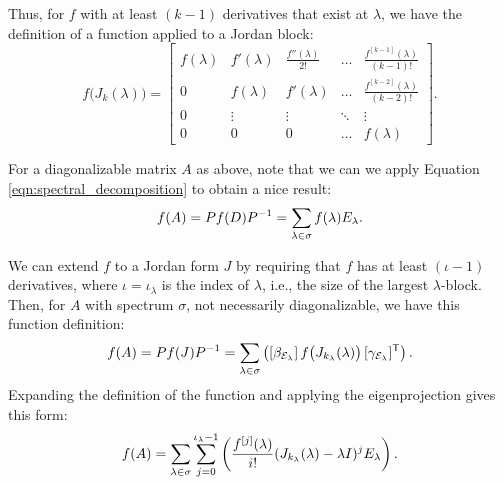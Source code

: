 \documentclass[../exploring-pagerank.tex]{subfiles}
\begin{document}
    Thus, for $f$ with at least $(k - 1)$ derivatives that exist at $\lambda$, we have the definition of a function applied to a Jordan block:
	\begin{equation}\label{eq:f_jordan_block}
		f\big( J_k(\lambda) \big) =
		\begin{bmatrix}
			f(\lambda) & f'(\lambda) & \frac{f''(\lambda)}{2!} & \ldots & \frac{f^{[k - 1]}(\lambda)}{(k-1)!} \\
			0 & f(\lambda) & f'(\lambda) & \ldots & \frac{f^{[k - 2]}(\lambda)}{(k-2)!} \\
			0 & \vdots & \vdots & \ddots & \vdots \\
			0 & 0 & 0 & \ldots & f(\lambda)
		\end{bmatrix}.
	\end{equation}

	For a diagonalizable matrix $A$ as above, note that we can we apply Equation \eqref{eqn:spectral_decomposition} to obtain a nice result:
	\begin{align*}
	    f(A) = Pf(D)P^{-1} = \sum_{\lambda \in \sigma}{f(\lambda) E_\lambda}.
	\end{align*}

	We can extend $f$ to a Jordan form $J$ by requiring that $f$ has at least $(\iota - 1)$ derivatives, where $\iota = \iota_\lambda$ is the index of $\lambda$, i.e., the size of the largest $\lambda$-block. Then, for $A$ with spectrum $\sigma$, not necessarily diagonalizable, we have this function definition:
	\begin{equation*}
	    f(A) = P f(J) P^{-1} = \sum_{\lambda \in \sigma}\left(  [\beta_{\mathcal{E}_\lambda}]\, f\big( J_{k_\lambda}(\lambda) \big)\, [\gamma_{\mathcal{E}_\lambda}]^{\mathsf{T}}  \right).
	\end{equation*}
    Expanding the definition of the function and applying the eigenprojection gives this form:
    \begin{equation}
        f(A) = \sum_{\lambda \in \sigma}\sum_{j=0}^{\iota_{\lambda} - 1}\left(  \frac{f^{[j]}(\lambda)}{i!} (J_{k_\lambda}(\lambda) - \lambda I)^j E_{\lambda}  \right).
    \end{equation}
\end{document}
